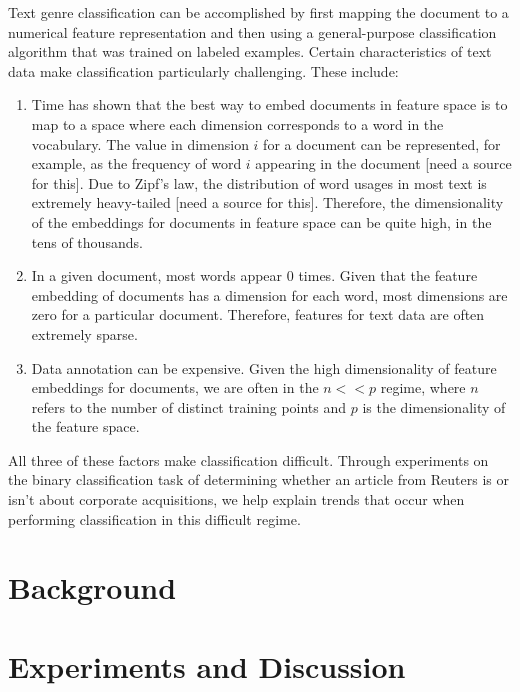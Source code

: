 \documentclass[]{article}
\begin{document}
Text genre classification can be accomplished by first mapping the document to a numerical feature representation and then using a general-purpose classification algorithm that was trained on labeled examples. Certain characteristics of text data make classification particularly challenging. These include:
\begin{enumerate}
\item Time has shown that the best way to embed documents in feature space is to map to a space where each dimension corresponds to a word in the vocabulary. The value in dimension $i$ for a document can be represented, for example, as the frequency of word $i$ appearing in the document [need a source for this]. Due to Zipf's law, the distribution of word usages in most text is extremely heavy-tailed [need a source for this]. Therefore, the dimensionality of the embeddings for documents in feature space can be quite high, in the tens of thousands. 
\item  In a given document, most words appear 0 times. Given that the feature embedding of documents has a dimension for each word, most dimensions are zero for a particular document. Therefore, features for text data are often extremely sparse. 
\item Data annotation can be expensive. Given the high dimensionality of feature embeddings for documents, we are often in the $n << p$ regime, where $n$ refers to the number of distinct training points and $p$ is the dimensionality of the feature space. 
\end{enumerate}
All three of these factors make classification difficult. Through experiments on the binary classification task of determining whether an article from Reuters is or isn't about corporate acquisitions, we help explain trends that occur when performing classification in this difficult regime. 
\section{Background}
\section{Experiments and Discussion}
\end{document}
